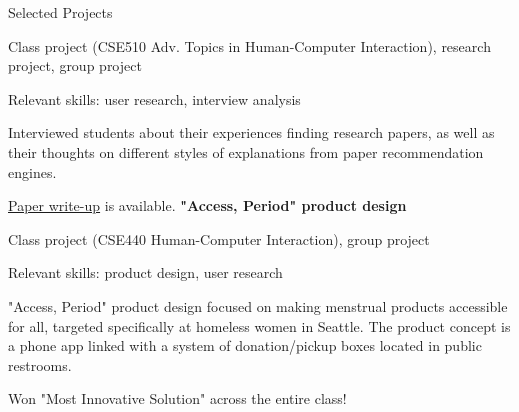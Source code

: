 \begin{rubric}{Selected Projects}
	\par Class project (CSE510 Adv. Topics in Human-Computer Interaction), research project, group project
	\par Relevant skills: user research, interview analysis
	\par Interviewed students about their experiences finding research papers, as well as their thoughts on different styles of explanations from paper recommendation engines. 
	\par \href{https://github.com/cephcyn/cephcyn.github.io/raw/master/documents/u_cse510/final_ContextExpl.pdf}{Paper write-up} is available.
\entry*[2019] %
	\textbf{"Access, Period" product design}
	\par Class project (CSE440 Human-Computer Interaction), group project
	\par Relevant skills: product design, user research
	\par "Access, Period" product design focused on making menstrual products accessible for all, targeted specifically at homeless women in Seattle. The product concept is a phone app linked with a system of donation/pickup boxes located in public restrooms.
	\par Won "Most Innovative Solution" across the entire class!

\end{rubric}
